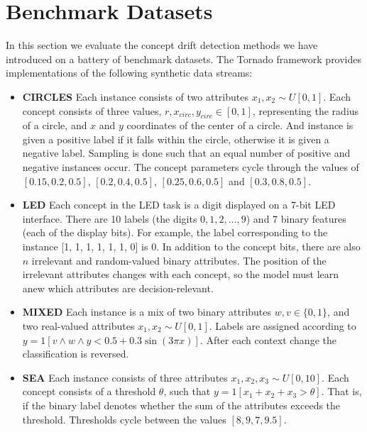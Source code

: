 
\section{Benchmark Datasets} \label{Experiments:benchmark}

In this section we evaluate the concept drift detection methods we have introduced on a battery of benchmark datasets. The Tornado framework provides implementations of the following synthetic data streams:
\begin{itemize}
    \item {\bf CIRCLES} Each instance consists of two attributes $x_1,x_2\sim U[0,1]$. Each concept consists of three values, $r,x_{circ},y_{circ}\in[0,1]$, representing the radius of a circle, and $x$ and $y$ coordinates of the center of a circle. And instance is given a positive label if it falls within the circle, otherwise it is given a negative label. Sampling is done such that an equal number of positive and negative instances occur. The concept parameters cycle through the values of $[0.15, 0.2, 0.5]$, $[0.2, 0.4, 0.5]$, $[0.25, 0.6, 0.5]$ and $[0.3, 0.8, 0.5]$.
    \item {\bf LED} Each concept in the LED task is a digit displayed on a 7-bit LED interface. There are 10 labels (the digits $0,1,2,\dots,9$) and 7 binary features (each of the display bits).  For example, the label corresponding to the instance [1, 1, 1, 1, 1, 1, 0] is $0$. In addition to the concept bits, there are also $n$ irrelevant and random-valued binary attributes. The position of the irrelevant attributes changes with each concept, so the model must learn anew which attributes are decision-relevant. 
    \item {\bf MIXED} Each instance is a mix of two binary attributes $w,v\in\{0,1\}$, and two real-valued attributes $x_1,x_2\sim U[0,1]$. Labels are assigned according to $y=\mathrm{1}[v \wedge w \wedge  y < 0.5 + 0.3 \sin(3\pi x)]$. After each context change the classification is reversed.
    \item {\bf SEA} Each instance consists of three attributes $x_1,x_2,x_3\sim U[0,10]$. Each concept consists of a threshold $\theta$, such that $y=\mathrm{1}[x_1+x_2+x_3 > \theta]$. That is, if the binary label denotes whether the sum of the attributes exceeds the threshold. Thresholds cycle between the values $[8, 9, 7, 9.5]$.

\end{itemize}

